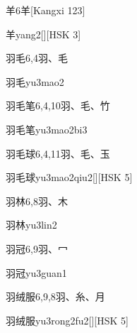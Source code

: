 \begin{entry}{羊}{6}{⽺}[Kangxi 123]
  \begin{phonetics}{羊}{yang2}[][HSK 3]
  \end{phonetics}
\end{entry}

\begin{entry}{羽毛}{6,4}{⽻、⽑}
  \begin{phonetics}{羽毛}{yu3mao2}
  \end{phonetics}
\end{entry}

\begin{entry}{羽毛笔}{6,4,10}{⽻、⽑、⽵}
  \begin{phonetics}{羽毛笔}{yu3mao2bi3}
  \end{phonetics}
\end{entry}

\begin{entry}{羽毛球}{6,4,11}{⽻、⽑、⽟}
  \begin{phonetics}{羽毛球}{yu3mao2qiu2}[][HSK 5]
  \end{phonetics}
\end{entry}

\begin{entry}{羽林}{6,8}{⽻、⽊}
  \begin{phonetics}{羽林}{yu3lin2}
  \end{phonetics}
\end{entry}

\begin{entry}{羽冠}{6,9}{⽻、⼍}
  \begin{phonetics}{羽冠}{yu3guan1}
  \end{phonetics}
\end{entry}

\begin{entry}{羽绒服}{6,9,8}{⽻、⽷、⽉}
  \begin{phonetics}{羽绒服}{yu3rong2fu2}[][HSK 5]
  \end{phonetics}
\end{entry}


